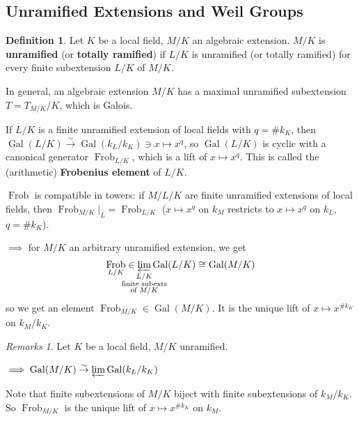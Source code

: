 \documentclass[a4paper]{article}
\theoremstyle{definition}
\newtheorem{definition}{Definition}
\theoremstyle{default}
\theoremstyle{remark}
\newtheorem*{remarks}{Remarks}
\DeclareMathOperator{\Gal}{Gal}
\DeclareMathOperator{\Frob}{Frob}
\begin{document}
\subsection{Unramified Extensions and Weil Groups}

\begin{definition}
	Let $K$ be a local field, $M/K$ an algebraic extension.
	$M/K$ is \textbf{unramified} (or \textbf{totally ramified})
	if $L/K$ is unramified (or totally ramified) for every finite subextension $L/K$ of $M/K$.
	
	In general, an algebraic extension $M/K$ has a maximal unramified subextension $T=T_{M/K}/K$, which is Galois.
\end{definition}

If $L/K$ is a finite unramified extension of local fields with $q = \# k_K$,
then $\Gal(L/K) \overset{\sim}{\to} \Gal(k_L/k_K) \ni x \mapsto x^q$,
so $\Gal(L/K)$ is cyclic with a canonical generator $\Frob_{L/K}$,
which is a lift of $x \mapsto x^q$.
This is called the (arithmetic) \textbf{Frobenius element} of $L/K$.

$\Frob$ is compatible in towers:
if $M/L/K$ are finite unramified extensions of local fields,
then $\Frob_{M/K}|_L = \Frob_{L/K}$
($x \mapsto x^q$ on $k_M$ restricts to $x \mapsto x^q$ on $k_L$, $q = \# k_K$).

$\implies$ for $M/K$ an arbitrary unramified extension, we get
$$\Frob_{L/K} \in \varprojlim_{\mathclap{\substack{L/K \\ \text{finite subexts} \\ \text{of } M/K}}} \Gal(L/K) \cong \Gal(M/K)$$
so we get an element $\Frob_{M/K} \in \Gal(M/K)$.
It is the unique lift of $x \mapsto x^{\# k_K}$ on $k_M/k_K$.

\begin{remarks}
	Let $K$ be a local field, $M/K$ unramified.
	\begin{center}
	\end{center}
	$\implies \Gal(M/K) \overset{\sim}{\to} \varprojlim \Gal(k_L/k_K)$
\end{remarks}

Note that finite subextensions of $M/K$ biject with finite subextensions of $k_M/k_K$.
So $\Frob_{M/K}$ is the unique lift of $x \mapsto x^{\# k_K}$ on $k_M$.
\end{document}
